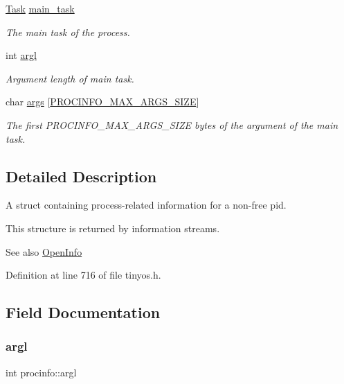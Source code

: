 \begin{DoxyCompactItemize}
\hyperlink{group__syscalls_gaec3f2f835e105271fbbc00272c0ba984}{Task} \hyperlink{structprocinfo_a4da339065f8780b37ab788f18ef9ed20}{main\+\_\+task}
\begin{DoxyCompactList}\small\item\em The main task of the process. \end{DoxyCompactList}\item 
int \hyperlink{structprocinfo_ac63081c5a10bc230c115eea36c5f22fd}{argl}
\begin{DoxyCompactList}\small\item\em Argument length of main task. \end{DoxyCompactList}\item 
char \hyperlink{structprocinfo_ac812ea3215fafc8ced9f91320b2d3959}{args} \mbox{[}\hyperlink{group__syscalls_ga657ad9e9d81dcca25fb225cf99051e0d}{P\+R\+O\+C\+I\+N\+F\+O\+\_\+\+M\+A\+X\+\_\+\+A\+R\+G\+S\+\_\+\+S\+I\+ZE}\mbox{]}
\begin{DoxyCompactList}\small\item\em The first {\ttfamily P\+R\+O\+C\+I\+N\+F\+O\+\_\+\+M\+A\+X\+\_\+\+A\+R\+G\+S\+\_\+\+S\+I\+ZE} bytes of the argument of the main task. \end{DoxyCompactList}\end{DoxyCompactItemize}


\subsection{Detailed Description}
A struct containing process-\/related information for a non-\/free pid. 

This structure is returned by information streams. \begin{DoxySeeAlso}{See also}
\hyperlink{group__syscalls_gaf326b11574cdc84a9e21b9d860076821}{Open\+Info} 
\end{DoxySeeAlso}


Definition at line 716 of file tinyos.\+h.



\subsection{Field Documentation}
\mbox{\label{structprocinfo_ac63081c5a10bc230c115eea36c5f22fd}} 
\subsubsection{\texorpdfstring{argl}{argl}}
{\footnotesize\ttfamily int procinfo\+::argl}



